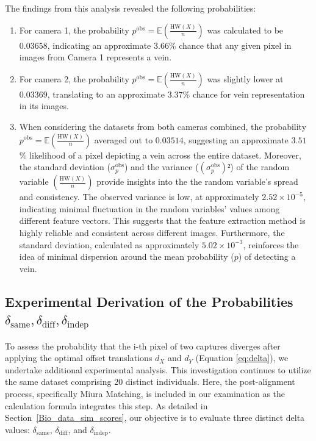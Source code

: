 The findings from this analysis revealed the following probabilities:
\begin{enumerate}
    \item For camera 1, the probability \(p^{\text{obs}} = \mathbb{E}\left( \frac{\text{HW}(X)}{n} \right)\) was calculated to be \(0.03658\), indicating an approximate \(3.66\)\% chance that any given pixel in images from Camera 1 represents a vein.

    \item For camera 2, the probability \(p^{\text{obs}} = \mathbb{E}\left( \frac{\text{HW}(X)}{n} \right)\) was slightly lower at \(0.03369\), translating to an approximate \(3.37\)\% chance for vein representation in its images.

    \item When considering the datasets from both cameras combined, the probability \(p^{\text{obs}} = \mathbb{E}\left( \frac{\text{HW}(X)}{n} \right)\) averaged out to \(0.03514\), suggesting an approximate \(3.51\)\% likelihood of a pixel depicting a vein across the entire dataset. Moreover, the standard deviation (\( \sigma^{\text{obs}}_p \)) and the variance (\((\sigma^{\text{obs}}_p)²\)) of the random variable \(\left( \frac{\text{HW}(X)}{n} \right)\) provide insights into the the random variable's spread and consistency. The observed variance is low, at approximately \( 2.52 \times 10^{-5} \), indicating minimal fluctuation in the random variables' values among different feature vectors. This suggests that the feature extraction method is highly reliable and consistent across different images. Furthermore, the standard deviation, calculated as approximately \( 5.02 \times 10^{-3} \), reinforces the idea of minimal dispersion around the mean probability (\(p\)) of detecting a vein. 
    
\end{enumerate}

\subsection{Experimental Derivation of the Probabilities \(\delta_{\text{same}}, \delta_{\text{diff}}, \delta_{\text{indep}}\)}
\label{sec:delta}

To assess the probability that the i-th pixel of two captures diverges after applying the optimal offset translations \( d_X \) and \( d_Y \) (Equation \ref{eq:delta}), we undertake additional experimental analysis. This investigation continues to utilize the same dataset comprising 20 distinct individuals. Here, the post-alignment process, specifically Miura Matching, is included in our examination as the calculation formula integrates this step. As detailed in Section~\ref{Bio_data_sim_scores}, our objective is to evaluate three distinct delta values: \(\delta_{\text{same}}\), \(\delta_{\text{diff}}\), and  \(\delta_{\text{indep}}\).\\


